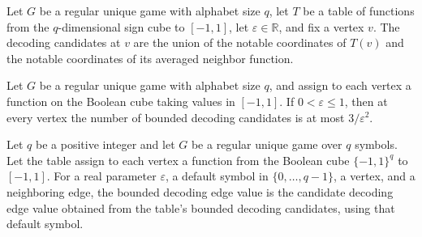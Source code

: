\begin{definition}
\label{FABL.RegularUniqueGame.boundedDecodingCandidates}
\leanok
{}
Let $G$ be a regular unique game with alphabet size $q$, let $T$ be a table of functions
from the $q$-dimensional sign cube to $[-1,1]$, let $\varepsilon\in\mathbb R$, and fix a
vertex $v$. The decoding candidates at $v$ are the union of the notable coordinates of
$T(v)$ and the notable coordinates of its averaged neighbor function.
\end{definition}

\begin{theorem}
\label{FABL.RegularUniqueGame.card_boundedDecodingCandidates_le}
\leanok
{}
Let $G$ be a regular unique game with alphabet size $q$, and assign to each vertex a function on the Boolean cube taking values in $[-1,1]$. If $0<\varepsilon\leq1$, then at every vertex the number of bounded decoding candidates is at most $3/\varepsilon^2$.
\end{theorem}

\begin{definition}
\label{FABL.RegularUniqueGame.boundedDecodingEdgeValue}
\leanok
{}
Let $q$ be a positive integer and let $G$ be a regular unique game over $q$ symbols. Let
the table assign to each vertex a function from the Boolean cube $\{−1,1\}^{q}$ to
$[-1,1]$. For a real parameter $\varepsilon$, a default symbol in
$\{0,\ldots,q-1\}$, a vertex, and a neighboring edge, the bounded decoding edge value
is the candidate decoding edge value obtained from the table’s bounded decoding
candidates, using that default symbol.
\end{definition}

